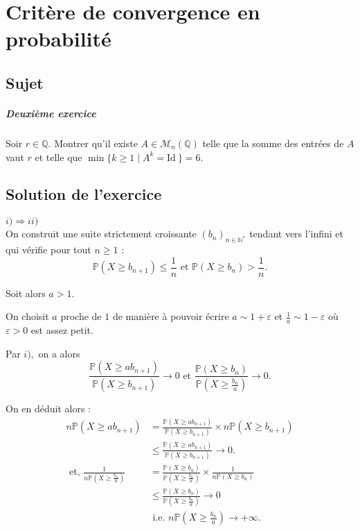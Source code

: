 \chapter{Critère de convergence en probabilité}

\section{Sujet}
\paragraph{Deuxième exercice}
Soir $r \in \mathbb Q.$ Montrer qu'il existe $A \in \mathcal M_n(\mathbb Q)$ telle que la somme des entrées de $A$ vaut $r$ et telle que $\min \{k\geqslant 1 \mid A^k = \mathrm{Id}\: \} =6.$

\section{Solution de l'exercice} %

$\boxed{i)\Longrightarrow ii)}$\\

On construit une suite strictement croissante $\displaystyle (b_{n})_{n\in\mathbb{N}^{*}}$ tendant vers l'infini et qui vérifie pour tout $n\geq 1$ : $$\mathbb{P}(X\geq b_{n+1})\leq \frac{1}{n} \mbox{ et }\mathbb{P}(X\geq b_{n})>\frac{1}{n}.$$

Soit alors $a>1.$ 

On choisit $a$ proche de $1$ de manière à pouvoir écrire $\displaystyle a\sim 1+\varepsilon$ et $\displaystyle \frac{1}{a}\sim 1-\varepsilon$ où $\varepsilon>0$ est assez petit.

Par $i),$ on a alors $$ \frac{\mathbb{P}(X\geq ab_{n+1})}{\mathbb{P}(X\geq b_{n+1})}\longrightarrow 0 \mbox{ et } \frac{\mathbb{P}(X\geq b_{n})}{\mathbb{P}(X\geq \frac{b_{n}}{a})}\longrightarrow 0.$$

On en déduit alors :  
\begin{align*}
n\mathbb{P}(X\geq ab_{n+1}) & = \frac{\mathbb{P}(X\geq ab_{n+1})}{\mathbb{P}(X\geq b_{n+1})}\times n\mathbb{P}(X\geq b_{n+1})\\
& \leq \frac{\mathbb{P}(X\geq ab_{n+1})}{\mathbb{P}(X\geq b_{n+1})} \longrightarrow 0.\\
\mbox{ et, } \frac{1}{n\mathbb{P}(X\geq \frac{b_{n}}{a})} & = \frac{\mathbb{P}(X\geq b_{n})}{\mathbb{P}(X\geq \frac{b_{n}}{a})}\times \frac{1}{n\mathbb{P}(X\geq b_{n})}\\
& \leq \frac{\mathbb{P}(X\geq b_{n})}{\mathbb{P}(X\geq \frac{b_{n}}{a})} \longrightarrow 0\\
& \mbox{ i.e. } n\mathbb{P}(X\geq \frac{b_{n}}{a}) \longrightarrow +\infty.
\end{align*}

